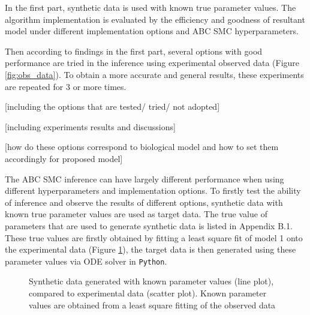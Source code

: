 \documentclass[12pt,a4paper]{report}
\begin{document}
In the first part, synthetic data is used with known true parameter values. The algorithm implementation is evaluated by the efficiency and goodness of resultant model under different implementation options and ABC SMC hyperparameters.

Then according to findings in the first part, several options with good performance are tried in the inference using experimental observed data (Figure \ref{fig:obs_data}). To obtain a more accurate and general results, these experiments are repeated for 3 or more times.

[including the options that are tested/ tried/ not adopted]

[including experiments results and discussions]

[how do these options correspond to biological model and how to set them accordingly for proposed model]

The ABC SMC inference can have largely different performance when using different hyperparameters and implementation options. To firstly test the ability of inference and observe the results of different options, synthetic data with known true parameter values are used as target data. The true value of parameters that are used to generate synthetic data is listed in Appendix B.1. These true values are firstly obtained by fitting a least square fit of model 1 onto the experimental data (Figure \ref{fig:infer_back_data}), the target data is then generated using these parameter values via ODE solver in \verb|Python|. 

\begin{figure}[h!]
    \begin{center}
    \end{center}
    
    \caption[Synthetic data generated with known parameter values]%
    {Synthetic data generated with known parameter values (line plot), compared to experimental data (scatter plot). Known parameter values are obtained from a least square fitting of the observed data} 
    \label{fig:infer_back_data}
    
\end{figure}
\end{document}
